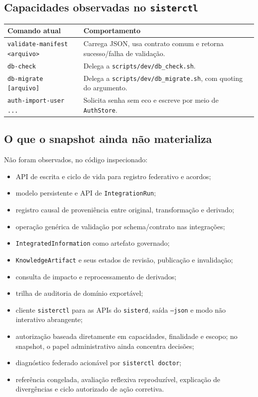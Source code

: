 \documentclass[11pt,a4paper,oneside]{article}
\begin{document}
\subsection{Capacidades observadas no \texttt{sisterctl}}
\begin{tabularx}{\textwidth}{P{4.7cm}Y}
\toprule
\textbf{Comando atual} & \textbf{Comportamento} \\
\midrule
\texttt{validate-manifest <arquivo>} & Carrega JSON, usa contrato comum e retorna sucesso/falha de validação. \\
\texttt{db-check} & Delega a \texttt{scripts/dev/db\_check.sh}. \\
\texttt{db-migrate [arquivo]} & Delega a \texttt{scripts/dev/db\_migrate.sh}, com quoting do argumento. \\
\texttt{auth-import-user ...} & Solicita senha sem eco e escreve por meio de \texttt{AuthStore}. \\
\bottomrule
\end{tabularx}

\subsection{O que o snapshot ainda não materializa}
Não foram observados, no código inspecionado:
\begin{itemize}
  \item API de escrita e ciclo de vida para registro federativo e acordos;
  \item modelo persistente e API de \texttt{IntegrationRun};
  \item registro causal de proveniência entre original, transformação e derivado;
  \item operação genérica de validação por schema/contrato nas integrações;
  \item \texttt{IntegratedInformation} como artefato governado;
  \item \texttt{KnowledgeArtifact} e seus estados de revisão, publicação e invalidação;
  \item consulta de impacto e reprocessamento de derivados;
  \item trilha de auditoria de domínio exportável;
  \item cliente \texttt{sisterctl} para as APIs do \texttt{sisterd}, saída \texttt{--json} e modo não interativo abrangente;
  \item autorização baseada diretamente em capacidades, finalidade e escopo; no snapshot, o papel administrativo ainda concentra decisões;
  \item diagnóstico federado acionável por \texttt{sisterctl doctor};
  \item referência congelada, avaliação reflexiva reproduzível, explicação de divergências e ciclo autorizado de ação corretiva.
\end{itemize}
\end{document}
